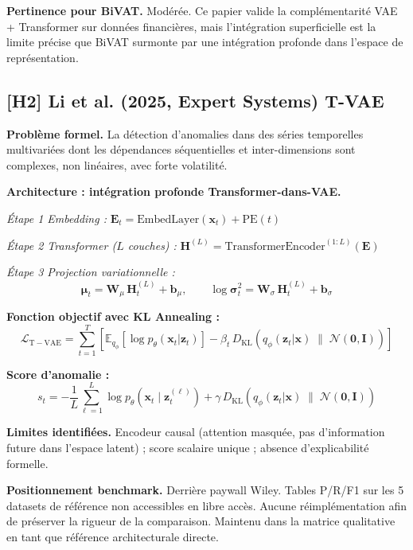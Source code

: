 \documentclass[12pt,a4paper]{article}
\begin{document}
\textbf{Pertinence pour BiVAT.} Modérée. Ce papier valide la complémentarité
VAE + Transformer sur données financières, mais l'intégration superficielle est
la limite précise que BiVAT surmonte par une intégration profonde dans l'espace
de représentation.

\subsection{[H2] Li et al. (2025, Expert Systems)  T-VAE}

\textbf{Problème formel.} La détection d'anomalies dans des séries temporelles
multivariées dont les dépendances séquentielles et inter-dimensions sont
complexes, non linéaires, avec forte volatilité.

\textbf{Architecture : intégration profonde Transformer-dans-VAE.}

\textit{Étape 1  Embedding :}
$\mathbf{E}_t = \mathrm{EmbedLayer}(\mathbf{x}_t) + \mathrm{PE}(t)$

\textit{Étape 2  Transformer ($L$ couches) :}
$\mathbf{H}^{(L)} = \mathrm{TransformerEncoder}^{(1:L)}(\mathbf{E})$

\textit{Étape 3  Projection variationnelle :}
$$\boldsymbol{\mu}_t = \mathbf{W}_\mu\,\mathbf{H}^{(L)}_t + \mathbf{b}_\mu,
\qquad \log\boldsymbol{\sigma}^2_t = \mathbf{W}_\sigma\,\mathbf{H}^{(L)}_t
+ \mathbf{b}_\sigma$$

\textbf{Fonction objectif avec KL Annealing :}
$$\mathcal{L}_{\mathrm{T-VAE}} = \sum_{t=1}^T\left[
\mathbb{E}_{q_\phi}\!\left[\log p_\theta(\mathbf{x}_t|\mathbf{z}_t)\right]
- \beta_t\,D_{\mathrm{KL}}\!\left(q_\phi(\mathbf{z}_t|\mathbf{x})
\;\|\; \mathcal{N}(\mathbf{0},\mathbf{I})\right)\right]$$

\textbf{Score d'anomalie :}
$$s_t = -\frac{1}{L}\sum_{\ell=1}^L\log p_\theta\!\left(
\mathbf{x}_t\mid\mathbf{z}^{(\ell)}_t\right) +
\gamma\,D_{\mathrm{KL}}(q_\phi(\mathbf{z}_t|\mathbf{x})\;\|\;
\mathcal{N}(\mathbf{0},\mathbf{I}))$$

\textbf{Limites identifiées.} Encodeur causal (attention masquée, pas
d'information future dans l'espace latent) ; score scalaire unique ; absence
d'explicabilité formelle.

\textbf{Positionnement benchmark.} Derrière paywall Wiley. Tables P/R/F1 sur
les 5 datasets de référence non accessibles en libre accès. Aucune
réimplémentation afin de préserver la rigueur de la comparaison. Maintenu
dans la matrice qualitative en tant que référence architecturale directe.
\end{document}
